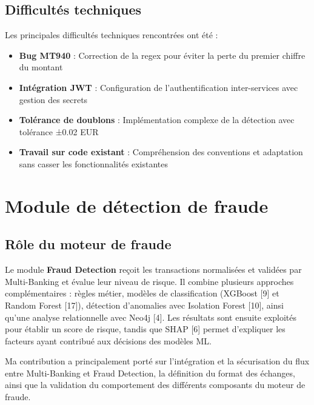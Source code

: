 \documentclass[12pt,a4paper]{extreport}
\begin{document}
\section{Difficultés techniques}

Les principales difficultés techniques rencontrées ont été :

\begin{itemize}
    \item \textbf{Bug MT940} : Correction de la regex pour éviter la perte du premier chiffre du montant
    \item \textbf{Intégration JWT} : Configuration de l'authentification inter-services avec gestion des secrets
    \item \textbf{Tolérance de doublons} : Implémentation complexe de la détection avec tolérance ±0.02 EUR
    \item \textbf{Travail sur code existant} : Compréhension des conventions et adaptation sans casser les fonctionnalités existantes
\end{itemize}



\chapter{Module de détection de fraude}

\section{Rôle du moteur de fraude}

Le module \textbf{Fraud Detection} reçoit les transactions normalisées et validées par Multi-Banking et évalue leur niveau de risque. Il combine plusieurs approches complémentaires : règles métier, modèles de classification (XGBoost [9] et Random Forest [17]), détection d'anomalies avec Isolation Forest [10], ainsi qu'une analyse relationnelle avec Neo4j [4]. Les résultats sont ensuite exploités pour établir un score de risque, tandis que SHAP [6] permet d'expliquer les facteurs ayant contribué aux décisions des modèles ML.

Ma contribution a principalement porté sur l'intégration et la sécurisation du flux entre Multi-Banking et Fraud Detection, la définition du format des échanges, ainsi que la validation du comportement des différents composants du moteur de fraude.
\end{document}
